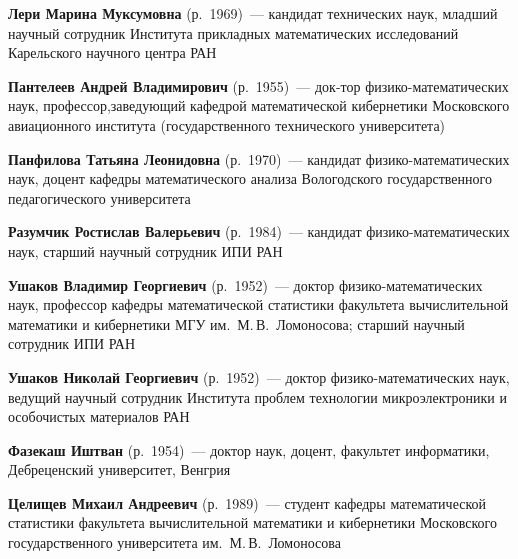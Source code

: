 \begin{multicols}{2}
\vspace*{6pt}

\noindent
\textbf{Лери Марина Муксумовна} (р.\ 1969)~--- кандидат технических наук, 
младший научный сотрудник Института прикладных математических исследований 
Карельского научного центра РАН


\columnbreak

\noindent
\textbf{Пантелеев Андрей Владимирович} (р.\ 1955)~--- док-\linebreak тор 
фи\-зи\-ко-ма\-те\-ма\-ти\-че\-ских наук, профессор,\linebreak за\-ве\-ду\-ющий 
кафедрой математической кибернетики Мос\-ков\-ско\-го авиационного института 
(государственного технического университета)


\vspace*{6pt}

\noindent
\textbf{Панфилова Татьяна Леонидовна} (р.\ 1970)~--- кандидат физико-математических наук,
доцент кафедры математического анализа Вологодского государственного
педагогического университета

\vspace*{6pt}

\noindent
\textbf{Разумчик Ростислав Валерьевич} (р.\ 1984)~--- кандидат физико-математических наук,
старший научный сотрудник ИПИ РАН



\vspace*{6pt}

\noindent
\textbf{Ушаков Владимир Георгиевич} (р.\ 1952)~--- доктор физико-математических наук,
профессор кафедры математической статистики факультета вычислительной математики и кибернетики МГУ
им.\ М.\,В.~Ломоносова; старший научный сотрудник ИПИ РАН

\vspace*{6pt}

\noindent
\textbf{Ушаков Николай Георгиевич} (р.\ 1952)~--- доктор фи\-зи\-ко-математических наук,
ведущий научный сотрудник Института проблем технологии микроэлектроники
и особочистых материалов РАН

\vspace*{6pt}

\noindent
\textbf{Фазекаш Иштван} (р.\ 1954)~--- доктор наук, доцент, 
факультет информатики, Дебреценский университет, Венгрия



\vspace*{6pt}

\noindent
\textbf{Целищев Михаил Андреевич} (р.\ 1989)~--- студент кафедры математической статистики 
факультета вычис\-лительной математики и кибернетики Московского государственного университета 
им.\ М.\,В.~Ломоносова


\end{multicols}
